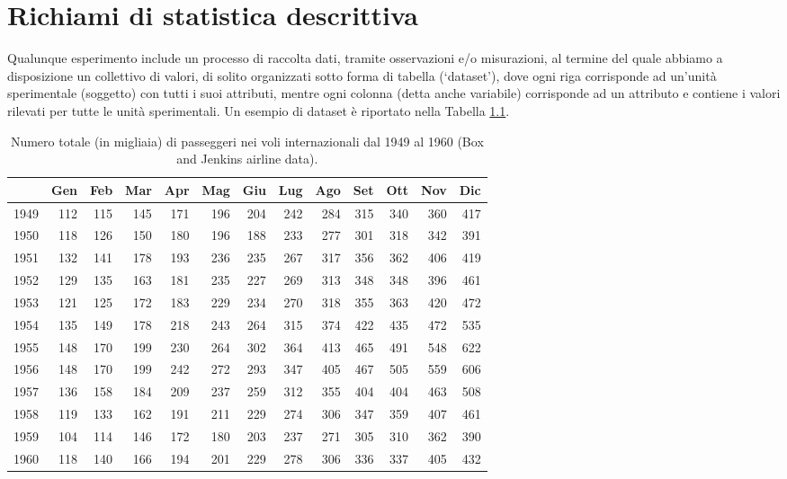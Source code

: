 \documentclass[a4paper,12pt,oneside]{book}
\begin{document}
\hypertarget{richiami-di-statistica-descrittiva}{%
\chapter{Richiami di statistica descrittiva}\label{richiami-di-statistica-descrittiva}}

Qualunque esperimento include un processo di raccolta dati, tramite osservazioni e/o misurazioni, al termine del quale abbiamo a disposizione un collettivo di valori, di solito organizzati sotto forma di tabella (`dataset'), dove ogni riga corrisponde ad un'unità sperimentale (soggetto) con tutti i suoi attributi, mentre ogni colonna (detta anche variabile) corrisponde ad un attributo e contiene i valori rilevati per tutte le unità sperimentali. Un esempio di dataset è riportato nella Tabella \ref{tab:tabName1}.

\begin{table}

\caption{\label{tab:tabName1}Numero totale (in migliaia) di passeggeri nei voli internazionali dal 1949 al 1960 (Box and Jenkins airline data).}
\centering
\begin{tabular}[t]{l|r|r|r|r|r|r|r|r|r|r|r|r}
\hline
  & Gen & Feb & Mar & Apr & Mag & Giu & Lug & Ago & Set & Ott & Nov & Dic\\
\hline
1949 & 112 & 115 & 145 & 171 & 196 & 204 & 242 & 284 & 315 & 340 & 360 & 417\\
\hline
1950 & 118 & 126 & 150 & 180 & 196 & 188 & 233 & 277 & 301 & 318 & 342 & 391\\
\hline
1951 & 132 & 141 & 178 & 193 & 236 & 235 & 267 & 317 & 356 & 362 & 406 & 419\\
\hline
1952 & 129 & 135 & 163 & 181 & 235 & 227 & 269 & 313 & 348 & 348 & 396 & 461\\
\hline
1953 & 121 & 125 & 172 & 183 & 229 & 234 & 270 & 318 & 355 & 363 & 420 & 472\\
\hline
1954 & 135 & 149 & 178 & 218 & 243 & 264 & 315 & 374 & 422 & 435 & 472 & 535\\
\hline
1955 & 148 & 170 & 199 & 230 & 264 & 302 & 364 & 413 & 465 & 491 & 548 & 622\\
\hline
1956 & 148 & 170 & 199 & 242 & 272 & 293 & 347 & 405 & 467 & 505 & 559 & 606\\
\hline
1957 & 136 & 158 & 184 & 209 & 237 & 259 & 312 & 355 & 404 & 404 & 463 & 508\\
\hline
1958 & 119 & 133 & 162 & 191 & 211 & 229 & 274 & 306 & 347 & 359 & 407 & 461\\
\hline
1959 & 104 & 114 & 146 & 172 & 180 & 203 & 237 & 271 & 305 & 310 & 362 & 390\\
\hline
1960 & 118 & 140 & 166 & 194 & 201 & 229 & 278 & 306 & 336 & 337 & 405 & 432\\
\hline
\end{tabular}
\end{table}
\end{document}
